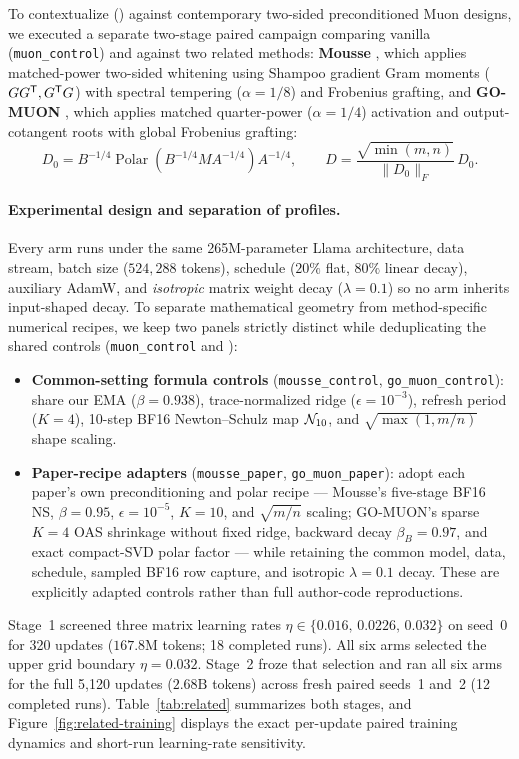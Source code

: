 To contextualize  (\mlpdiag{}) against contemporary two-sided
preconditioned Muon designs, we executed a separate two-stage paired campaign
comparing vanilla  (\texttt{muon\_control}) and 
against two related methods: \textbf{Mousse} \citep{zhang2026mousse}, which
applies matched-power two-sided whitening using Shampoo gradient Gram moments
($GG^{{\mathsf T}}, G^{{\mathsf T}}G$) with spectral tempering ($\alpha = 1/8$) and Frobenius
grafting, and \textbf{GO-MUON} \citep{che2026gomuon}, which applies matched
quarter-power ($\alpha = 1/4$) activation and output-cotangent roots with global
Frobenius grafting:
\begin{equation}
\label{eq:gomuon}
D_0 = B^{-1/4}\operatorname{Polar}\!\left(B^{-1/4} M A^{-1/4}\right)A^{-1/4},
\qquad
D = \frac{\sqrt{\min(m,n)}}{\|D_0\|_F}\,D_0 .
\end{equation}

\paragraph{Experimental design and separation of profiles.}
Every arm runs under the same 265M-parameter Llama architecture, data stream,
batch size ($524{,}288$ tokens), schedule ($20\%$ flat, $80\%$ linear decay),
auxiliary AdamW, and \emph{isotropic} matrix weight decay ($\lambda = 0.1$) so
no arm inherits input-shaped decay. To separate mathematical geometry from
method-specific numerical recipes, we keep two panels strictly distinct while
deduplicating the shared controls (\texttt{muon\_control} and \mlpdiag{}):
\begin{itemize}
\item \textbf{Common-setting formula controls} (\texttt{mousse\_control},
  \texttt{go\_muon\_control}): share our EMA ($\beta = 0.938$), trace-normalized
  ridge ($\epsilon = 10^{-3}$), refresh period ($K = 4$), 10-step BF16
  Newton--Schulz map $\mathcal{N}_{10}$, and $\sqrt{\max(1,m/n)}$ shape scaling.
\item \textbf{Paper-recipe adapters} (\texttt{mousse\_paper},
  \texttt{go\_muon\_paper}): adopt each paper's own preconditioning and polar
  recipe --- Mousse's five-stage BF16 NS, $\beta = 0.95$, $\epsilon = 10^{-5}$,
  $K = 10$, and $\sqrt{m/n}$ scaling; GO-MUON's sparse $K = 4$ OAS shrinkage
  without fixed ridge, backward decay $\beta_B = 0.97$, and exact compact-SVD
  polar factor --- while retaining the common model, data, schedule, sampled
  BF16 row capture, and isotropic $\lambda = 0.1$ decay. These are explicitly
  adapted controls rather than full author-code reproductions.
\end{itemize}
Stage~1 screened three matrix learning rates
$\eta \in \{0.016,\,0.0226,\,0.032\}$ on seed~0 for 320 updates
($167.8\text{M}$ tokens; 18 completed runs). All six arms selected the upper
grid boundary $\eta = 0.032$. Stage~2 froze that selection and ran all six arms
for the full 5{,}120 updates ($2.68\text{B}$ tokens) across fresh paired seeds~1
and~2 (12 completed runs). Table~\ref{tab:related} summarizes both stages, and
Figure~\ref{fig:related-training} displays the exact per-update paired training
dynamics and short-run learning-rate sensitivity.

